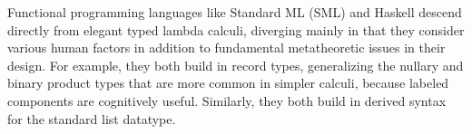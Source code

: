 Functional programming languages like Standard ML (SML) and Haskell descend directly from  elegant typed lambda calculi, diverging mainly in that they consider  various human factors in addition to fundamental metatheoretic issues in their design.  
For example, they both build in record types, generalizing the nullary and binary product types that are more common in simpler calculi, because labeled components are cognitively useful. Similarly, they both build in derived  syntax for the standard list datatype.%

